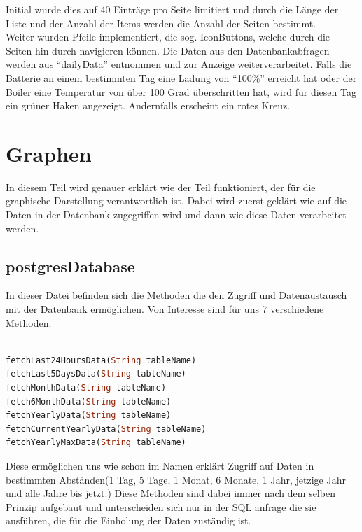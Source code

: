 \documentclass[11pt]{scrartcl}
\begin{document}
    Initial wurde dies auf 40 Einträge pro Seite limitiert und durch die Länge der Liste und der Anzahl der Items werden
    die Anzahl der Seiten bestimmt. \\
    Weiter wurden Pfeile implementiert, die sog. IconButtons, welche durch die Seiten hin durch navigieren können.
    Die Daten aus den Datenbankabfragen werden aus \enquote{dailyData} entnommen und zur Anzeige weiterverarbeitet.
    Falls die Batterie an einem bestimmten Tag eine Ladung von \enquote{100\%} erreicht hat oder der Boiler eine
    Temperatur von über 100 Grad überschritten hat, wird für diesen Tag ein grüner Haken angezeigt.
    Andernfalls erscheint ein rotes Kreuz.

\newpage

\section*{Graphen}

In diesem Teil wird genauer erklärt wie der Teil funktioniert, der für die graphische Darstellung verantwortlich ist. Dabei wird zuerst geklärt wie auf die Daten in der Datenbank zugegriffen wird und dann wie diese Daten verarbeitet werden.

\subsection*{postgresDatabase}

In dieser Datei befinden sich die Methoden die den 
Zugriff und Datenaustausch mit der Datenbank ermöglichen. Von Interesse sind für uns 7 verschiedene Methoden. 

\begin{lstlisting}[language=Dart]

fetchLast24HoursData(String tableName)
fetchLast5DaysData(String tableName)
fetchMonthData(String tableName)
fetch6MonthData(String tableName)
fetchYearlyData(String tableName)
fetchCurrentYearlyData(String tableName)
fetchYearlyMaxData(String tableName)

\end{lstlisting}

Diese ermöglichen uns wie schon im Namen erklärt Zugriff auf Daten in bestimmten Abständen(1 Tag, 5 Tage, 1 Monat, 6 Monate, 1 Jahr, jetzige Jahr und alle Jahre bis jetzt.) Diese Methoden sind dabei immer nach dem selben Prinzip aufgebaut und unterscheiden sich nur in der SQL anfrage die sie ausführen, die für die Einholung der Daten zuständig ist.
\end{document}
